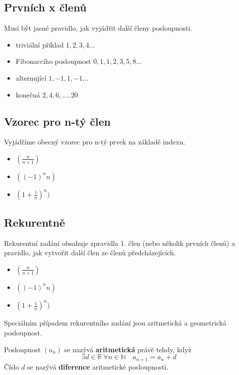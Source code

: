 \documentclass[openany,12pt,a4paper]{book}
\begin{document}
	\subsection{Prvních x členů}
		Musí být jasné pravidlo, jak vyjádřit další členy posloupnosti.
		\begin{example}
			\begin{itemize}
				\item triviální příklad $1, 2, 3, 4 ... $
				\item Fibonacciho posloupnost $0, 1, 1, 2, 3, 5, 8 ...$
				\item alternující $1, -1, 1, -1 ...$
				\item konečná $2, 4, 6, ..., 20$
			\end{itemize}
		\end{example}
	\subsection{Vzorec pro n-tý člen}
		Vyjádříme obecný vzorec pro n-tý prvek na základě indexu.
		\begin{example}
			\begin{itemize}
				\item $(\frac{n}{n+1})$
				\item $((-1)^nn)$
				\item $ (1 + \frac{1}{n})^n)$
			\end{itemize}
		\end{example}
	
	\subsection{Rekurentně} 
		Rekurentní zadání obsahuje zpravidla 1. člen (nebo několik prvních členů) a pravidlo, jak vytvořit další člen ze členů předcházejících.
		\begin{example}
			\begin{itemize}
				\item $(\frac{n}{n+1})$
				\item $((-1)^nn)$
				\item $ (1 + \frac{1}{n})^n)$
			\end{itemize}
		\end{example}
Speciálním případem rekurentního zadání jsou aritmetická a geometrická posloupnost.

\begin{definition}
	Posloupnost $(a_n)$ se nazývá \textbf{aritmetická} právě tehdy, když
	\[
	\exists d \in \mathbb{R} \ \forall n \in \mathbb{N} \quad a_{n+1} = a_n + d
	\]
	Číslo $d$ se nazývá \textbf{diference} aritmetické posloupnosti.
\end{definition}
\end{document}
